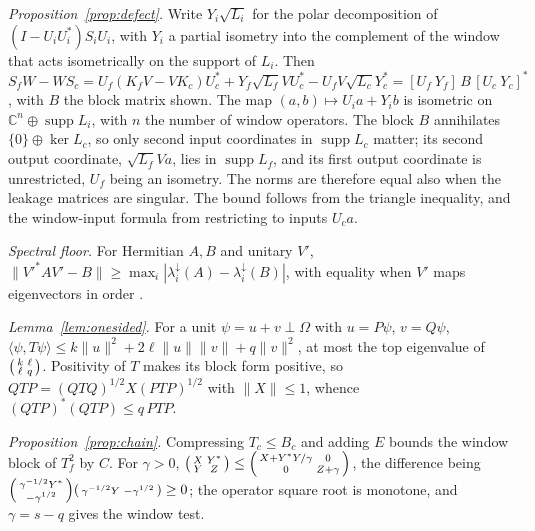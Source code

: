 \documentclass[11pt]{article}
\begin{document}
\emph{Proposition~\ref{prop:defect}.} Write $Y_i\sqrt{L_i}$ for the polar decomposition of
$(I-U_iU_i^*)S_iU_i$, with $Y_i$ a partial isometry into the complement of the window that acts
isometrically on the support of $L_i$. Then $S_fW-WS_c=U_f(K_fV-VK_c)U_c^*+Y_f\sqrt{L_f}VU_c^*-
U_fV\sqrt{L_c}Y_c^*=[U_f\ Y_f]\,B\,[U_c\ Y_c]^*$, with $B$ the block matrix shown. The map
$(a,b)\mapsto U_ia+Y_ib$ is isometric on $\mathbb C^{n}\oplus\operatorname{supp}L_i$, with $n$ the number of window operators. The block $B$
annihilates $\{0\}\oplus\ker L_c$, so only second input coordinates in $\operatorname{supp}L_c$ matter;
its second output coordinate, $\sqrt{L_f}Va$, lies in $\operatorname{supp}L_f$, and its first output
coordinate is unrestricted, $U_f$ being an isometry. The norms are therefore equal also when the leakage
matrices are singular. The
bound follows from the triangle inequality, and the window-input formula from restricting to inputs
$U_ca$.

\emph{Spectral floor.} For Hermitian $A,B$ and unitary $V'$, $\|V'^*AV'-B\|\ge\max_i|\lambda_i^\downarrow(A)-
\lambda_i^\downarrow(B)|$, with equality when $V'$ maps eigenvectors in order \cite{Bhatia}.

\emph{Lemma~\ref{lem:onesided}.} For a unit $\psi=u+v\perp\Omega$ with $u=P\psi$, $v=Q\psi$,
$\langle\psi,T\psi\rangle\le k\|u\|^2+2\ell\|u\|\|v\|+q\|v\|^2$, at most the top eigenvalue of
$\begin{psmallmatrix}k&\ell\\ \ell&q\end{psmallmatrix}$. Positivity of $T$ makes its block form positive, so
$QTP=(QTQ)^{1/2}X(PTP)^{1/2}$ with $\|X\|\le1$, whence $(QTP)^*(QTP)\le q\,PTP$.

\emph{Proposition~\ref{prop:chain}.} Compressing $T_c\le B_c$ and adding $E$ bounds the window block of
$T_f^2$ by $C$. For $\gamma>0$, $\begin{psmallmatrix}X&Y^*\\Y&Z\end{psmallmatrix}\le
\begin{psmallmatrix}X+Y^*Y/\gamma&0\\0&Z+\gamma\end{psmallmatrix}$, the difference being
$\begin{psmallmatrix}\gamma^{-1/2}Y^*\\-\gamma^{1/2}\end{psmallmatrix}
\begin{psmallmatrix}\gamma^{-1/2}Y&-\gamma^{1/2}\end{psmallmatrix}\ge0$; the operator square root is
monotone, and $\gamma=s-q$ gives the window test.
\end{document}
